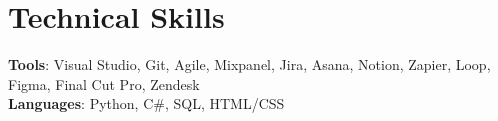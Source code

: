 \section{Technical Skills}
\begin{itemize}[leftmargin=0.15in, label={}]
    \small{
      \item{
      \textbf{Tools}{: Visual Studio, Git, Agile, Mixpanel, Jira, Asana, Notion, Zapier, Loop, Figma, Final Cut Pro, Zendesk} \\
      \textbf{Languages}{: Python, C\#, SQL, HTML/CSS} \\
      }
    }
  \end{itemize}